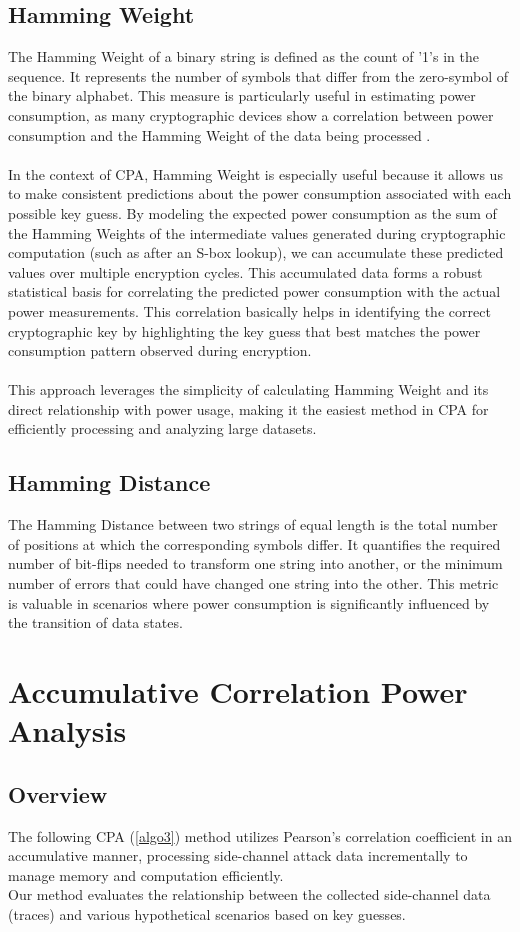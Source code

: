 \documentclass[a4paper,10pt]{article}
\begin{document}
\subsection{Hamming Weight}
The Hamming Weight of a binary string is defined as the count of '1's in the sequence. 
It represents the number of symbols that differ from the zero-symbol of the binary alphabet. 
This measure is particularly useful in estimating power consumption, as many cryptographic devices show a correlation between power consumption and the Hamming Weight of the data being processed \cite{Fan2022}.
\\ \\
In the context of CPA, Hamming Weight is especially useful because it allows us to make consistent predictions 
about the power consumption associated with each possible key guess. 
By modeling the expected power consumption as the sum of the Hamming Weights of the intermediate values generated 
during cryptographic computation (such as after an S-box lookup), 
we can accumulate these predicted values over multiple encryption cycles. This accumulated data forms a robust statistical 
basis for correlating the predicted power consumption with the actual power measurements. 
This correlation basically helps in identifying the correct cryptographic key by highlighting the key guess that best matches the power consumption pattern observed during encryption.
\\ \\
This approach leverages the simplicity of calculating Hamming Weight and its direct relationship with power usage, making it the easiest method in CPA for efficiently processing and analyzing large datasets.
\subsection{Hamming Distance}
The Hamming Distance between two strings of equal length is the total number of positions at which the corresponding symbols differ. 
It quantifies the required number of bit-flips needed to transform one string into another, or the minimum number of errors that could have changed one string into the other. This metric is valuable in scenarios where power consumption is significantly influenced by the transition of data states.

\section{Accumulative Correlation Power Analysis}
\subsection{Overview}
The following CPA (\ref{algo3}) method utilizes Pearson's correlation coefficient in an accumulative manner, processing side-channel attack data incrementally to manage memory and computation efficiently.\\
Our method evaluates the relationship between the collected side-channel data (traces) and various hypothetical scenarios based on key guesses. 
\end{document}
